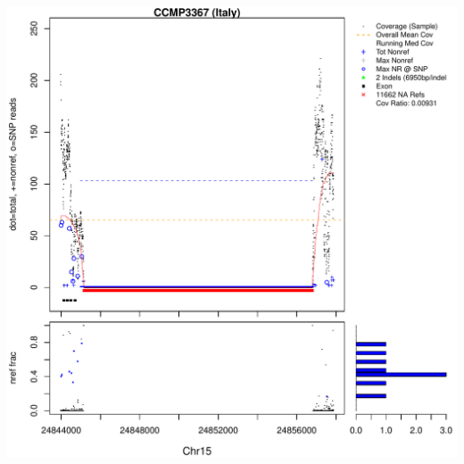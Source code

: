 \documentclass{article}\usepackage[]{graphicx}\usepackage[]{color}
\makeatletter
\def\maxwidth{ %
  \ifdim\Gin@nat@width>\linewidth
    \linewidth
  \else
    \Gin@nat@width
  \fi
}
\newenvironment{knitrout}{}{} %
\makeatother
\begin{document}
\begin{knitrout}
{\includegraphics[width=\maxwidth]{figs-knitr/unnamed-chunk-57-7} 

}



\end{knitrout}
\end{document}

